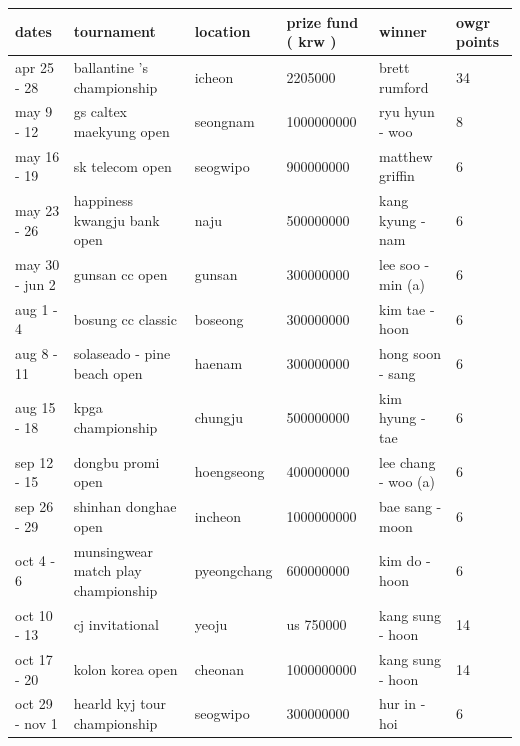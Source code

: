\documentclass{article}
\begin{document}
\begin{tabular}{llllll}
\toprule
dates & tournament & location & prize fund ( krw ) & winner & owgr points \\
\midrule
apr 25 - 28 & ballantine 's championship & icheon & 2205000 & brett rumford & 34 \\
may 9 - 12 & gs caltex maekyung open & seongnam & 1000000000 & ryu hyun - woo & 8 \\
may 16 - 19 & sk telecom open & seogwipo & 900000000 & matthew griffin & 6 \\
may 23 - 26 & happiness kwangju bank open & naju & 500000000 & kang kyung - nam & 6 \\
may 30 - jun 2 & gunsan cc open & gunsan & 300000000 & lee soo - min (a) & 6 \\
aug 1 - 4 & bosung cc classic & boseong & 300000000 & kim tae - hoon & 6 \\
aug 8 - 11 & solaseado - pine beach open & haenam & 300000000 & hong soon - sang & 6 \\
aug 15 - 18 & kpga championship & chungju & 500000000 & kim hyung - tae & 6 \\
sep 12 - 15 & dongbu promi open & hoengseong & 400000000 & lee chang - woo (a) & 6 \\
sep 26 - 29 & shinhan donghae open & incheon & 1000000000 & bae sang - moon & 6 \\
oct 4 - 6 & munsingwear match play championship & pyeongchang & 600000000 & kim do - hoon & 6 \\
oct 10 - 13 & cj invitational & yeoju & us 750000 & kang sung - hoon & 14 \\
oct 17 - 20 & kolon korea open & cheonan & 1000000000 & kang sung - hoon & 14 \\
oct 29 - nov 1 & hearld kyj tour championship & seogwipo & 300000000 & hur in - hoi & 6 \\
\bottomrule
\end{tabular}
\end{document}
